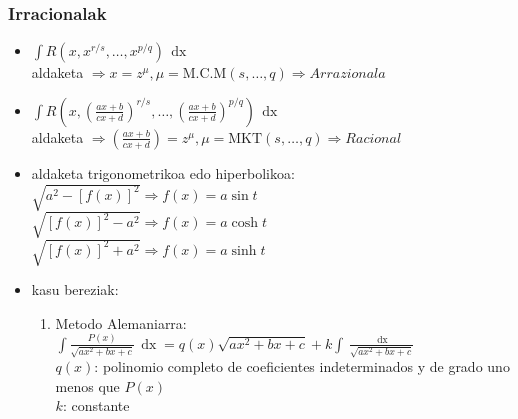 \documentclass[8pt]{article}
\DeclareMathOperator{\xder}{\, \mathrm{d}x}
\begin{document}
		\subsubsection{Irracionalak}
			\begin{itemize}
				\item $ \int R (x, x^{r/s}, \dots , x^{p/q}) \xder $\\
					aldaketa $ \Rightarrow x = z^{\mu},
					\mu = \text{M.C.M} (s, \dots, q) \Rightarrow Arrazionala $
				\item $ \int R (x, (\frac{ax+b}{cx+d})^{r/s}, \dots, 
					(\frac{ax+b}{cx+d})^{p/q}) \xder $\\
					aldaketa $ \Rightarrow (\frac{ax+b}{cx+d}) = z^{\mu},
					\mu = \text{MKT} (s, \dots, q) \Rightarrow Racional $
				\item aldaketa trigonometrikoa edo hiperbolikoa:\\
					$ \sqrt{a^2 - [f(x)]^2} \Rightarrow f(x) = a \sin t $\\
					$ \sqrt{[f(x)]^2 - a^2} \Rightarrow f(x) = a \cosh t $\\
					$ \sqrt{[f(x)]^2 + a^2} \Rightarrow f(x) = a \sinh t $
				\item kasu bereziak:
					\begin{enumerate}
						\item Metodo Alemaniarra:
							$ \int \frac{P(x)}{\sqrt{a x^2 + bx + c}} \xder =
							q(x) \sqrt{a x^2 + bx + c} + k \int \frac{\xder}{\sqrt{a x^2 + bx + c}} $\\

							$ q(x) $: polinomio completo de coeficientes indeterminados y
							de grado uno menos que $ P(x) $\\
							$ k $: constante
								

\end{enumerate}
\end{itemize}
\end{document}
